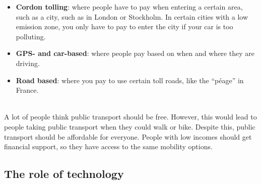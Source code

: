 \documentclass[../summary.tex]{subfiles}
\begin{document}
\begin{itemize}
	\setlength{\itemsep}{0pt}
	\item \textbf{Cordon tolling}: where people have to pay when entering a certain area, such as a city, such as in London or Stockholm. In certain cities with a low emission zone, you only have to pay to enter the city if your car is too polluting.
	\item \textbf{GPS- and car-based}: where people pay based on when and where they are driving.
	\item \textbf{Road based}: where you pay to use certain toll roads, like the “péage” in France.
\end{itemize}

\ \\
A lot of people think public transport should be free. However, this would lead to people taking public transport when they could walk or bike. Despite this, public transport should be affordable for everyone. People with low incomes should get financial support, so they have access to the same mobility options.

\subsection{The role of technology}
\end{document}

